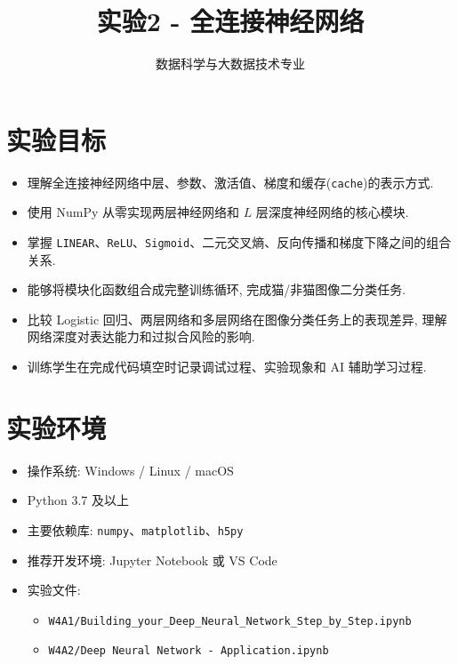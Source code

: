 \documentclass{../../nndlcourse}
\begin{document}
\title{实验2 - 全连接神经网络}
\author{数据科学与大数据技术专业}
\date{}
\maketitle


\section{实验目标}
\begin{itemize}
    \item 理解全连接神经网络中层、参数、激活值、梯度和缓存(\texttt{cache})的表示方式.
    \item 使用 NumPy 从零实现两层神经网络和 $L$ 层深度神经网络的核心模块.
    \item 掌握 \texttt{LINEAR}、\texttt{ReLU}、\texttt{Sigmoid}、二元交叉熵、反向传播和梯度下降之间的组合关系.
    \item 能够将模块化函数组合成完整训练循环, 完成猫/非猫图像二分类任务.
    \item 比较 Logistic 回归、两层网络和多层网络在图像分类任务上的表现差异, 理解网络深度对表达能力和过拟合风险的影响.
    \item 训练学生在完成代码填空时记录调试过程、实验现象和 AI 辅助学习过程.
\end{itemize}


\section{实验环境}
\begin{itemize}
    \item 操作系统: Windows / Linux / macOS
    \item Python 3.7 及以上
    \item 主要依赖库: \texttt{numpy}、\texttt{matplotlib}、\texttt{h5py}
    \item 推荐开发环境: Jupyter Notebook 或 VS Code
    \item 实验文件:
    \begin{itemize}
        \item \texttt{W4A1/Building\_your\_Deep\_Neural\_Network\_Step\_by\_Step.ipynb}
        \item \texttt{W4A2/Deep Neural Network - Application.ipynb}
    \end{itemize}
\end{itemize}
\end{document}
